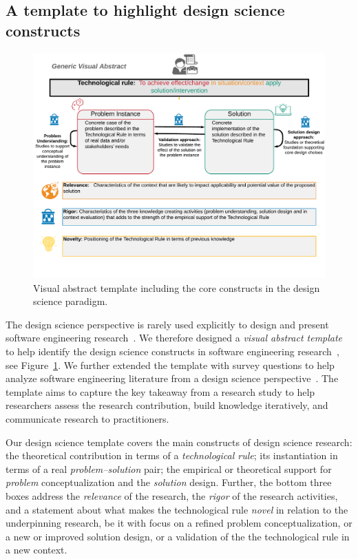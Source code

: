 \documentclass[graybox]{svmult}
\begin{document}
\subsection{A template to highlight design science constructs}%
\label{sec:VA_template}

\begin{figure}[t]
\includegraphics[width=1.0\textwidth, trim={0 15mm 0 0},clip]{Figures/GenericVA.png}
\caption{Visual abstract template including the core constructs in the design science paradigm.}
\label{fig:VA-template}      
\end{figure}


The design science perspective is rarely used explicitly to design and present software engineering research~\cite{Engstrom19arxiv}. We therefore designed a \emph{visual abstract template} to help identify the design science constructs in software engineering research~\cite{StoreyESEM17}, see Figure~\ref{fig:VA-template}. We further extended the template with survey questions to help analyze software engineering literature from a design science perspective~\cite{Engstrom19arxiv}. The template aims to capture the key takeaway from a research study to help researchers assess the research contribution, build knowledge iteratively, and communicate research to practitioners. %

Our design science template covers the main constructs of design science research: the theoretical contribution in terms of a \emph{technological rule}; its instantiation in terms of a real \emph{problem--solution} pair; the empirical or theoretical support for \emph{problem} conceptualization and the \emph{solution} design. Further, the bottom three boxes address the \emph{relevance} of the research, the \emph{rigor} of the research activities, and a statement about what makes the technological rule \emph{novel} in relation to the underpinning research, be it with focus on a refined problem conceptualization, or a new or improved solution design, or a validation of the the technological rule in a new context. 
\end{document}
